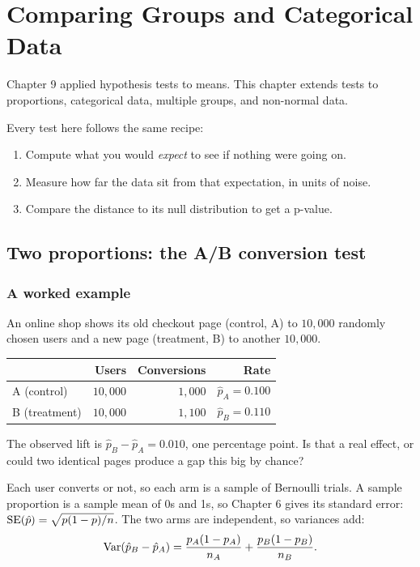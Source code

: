 \chapter{Comparing Groups and Categorical Data}
\label{ch:comparing-groups}

Chapter 9 applied hypothesis tests to means. This chapter extends tests to proportions, categorical data, multiple groups, and non-normal data.

Every test here follows the same recipe:
\begin{enumerate}
  \item Compute what you would \emph{expect} to see if nothing were going on.
  \item Measure how far the data sit from that expectation, in units of noise.
  \item Compare the distance to its null distribution to get a p-value.
\end{enumerate}

\section{Two proportions: the A/B conversion test}
\label{sec:cg-two-prop}

\subsection{A worked example}

An online shop shows its old checkout page (control, A) to $10{,}000$ randomly
chosen users and a new page (treatment, B) to another $10{,}000$.

\begin{center}
\begin{tabular}{lrrr}
\toprule
 & Users & Conversions & Rate \\
\midrule
A (control) & $10{,}000$ & $1{,}000$ & $\hat p_A = 0.100$ \\
B (treatment) & $10{,}000$ & $1{,}100$ & $\hat p_B = 0.110$ \\
\bottomrule
\end{tabular}
\end{center}

The observed lift is $\hat p_B - \hat p_A = 0.010$, one percentage point. Is
that a real effect, or could two identical pages produce a gap this big by
chance?

Each user converts or not, so each arm is a sample of Bernoulli trials. A
sample proportion is a sample mean of 0s and 1s, so Chapter 6 gives its
standard error: $\operatorname{SE}(\hat p) = \sqrt{p(1-p)/n}$. The two arms are independent,
so variances add:
\[
  \operatorname{Var}(\hat p_B - \hat p_A) = \frac{p_A(1-p_A)}{n_A} + \frac{p_B(1-p_B)}{n_B}.
\]

